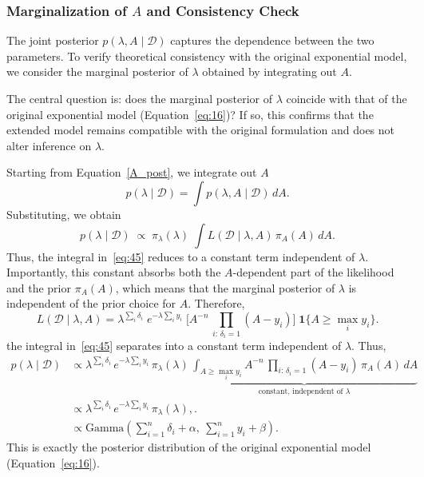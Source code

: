 \subsubsection{Marginalization of \texorpdfstring{$A$}{A} and Consistency Check}
\label{边际化章节}
The joint posterior $p(\lambda, A \mid \mathcal D)$ captures the dependence between the two parameters. To verify theoretical consistency with the original exponential model, we consider the marginal posterior of $\lambda$ obtained by integrating out $A$.   

The central question is: does the marginal posterior of $\lambda$ coincide with that of the original exponential model (Equation~\ref{eq:16})? If so, this confirms that the extended model remains compatible with the original formulation and does not alter inference on $\lambda$.

Starting from Equation~\eqref{A_post}, we integrate out $A$
\begin{equation}
    p(\lambda \mid \mathcal D)
= \int p(\lambda, A \mid \mathcal D)\,dA.
\end{equation}
Substituting, we obtain
\begin{equation}
    p(\lambda \mid \mathcal D)\;\propto\;\pi_\lambda(\lambda)\;\int L(\mathcal D \mid \lambda, A)\,\pi_A(A)\,dA.
    \label{eq:45}
\end{equation}
Thus, the integral in~\eqref{eq:45} reduces to a constant term independent of $\lambda$. 
Importantly, this constant absorbs both the $A$-dependent part of the likelihood and the prior $\pi_A(A)$, which means that the marginal posterior of $\lambda$ is independent of the prior choice for $A$. 
Therefore,
\begin{equation}
    L(\mathcal D \mid \lambda, A)
= \lambda^{\sum_i \delta_i}\;
e^{-\lambda \sum_i y_i}\;
\Bigg[
A^{-n}\,\prod_{i:\,\delta_i=1}(A-y_i)
\Bigg]\;\mathbf 1\{A \ge \max_i y_i\}.
\end{equation}
the integral in~\eqref{eq:45} separates into a constant term independent of $\lambda$. Thus,
\begin{align}
p(\lambda \mid \mathcal{D})
&\propto \lambda^{\sum_i \delta_i}\,
e^{-\lambda \sum_i y_i}\,
\pi_\lambda(\lambda)\,
\underbrace{\int_{A \ge \max_i y_i}
A^{-n}\,\prod_{i:\,\delta_i=1}(A-y_i)\,\pi_A(A)\,dA}_{\text{constant, independent of }\lambda} \\[2pt]
&\propto \lambda^{\sum_i \delta_i}\, e^{-\lambda \sum_i y_i}\, \pi_{\lambda}(\lambda), .\\
&\propto
\text{Gamma}
\left(
\sum_{i=1}^{n} \delta_i + \alpha,\ \sum_{i=1}^{n} y_i + \beta
\right).
\end{align}
This is exactly the posterior distribution of the original exponential model (Equation~\ref{eq:16}).  

